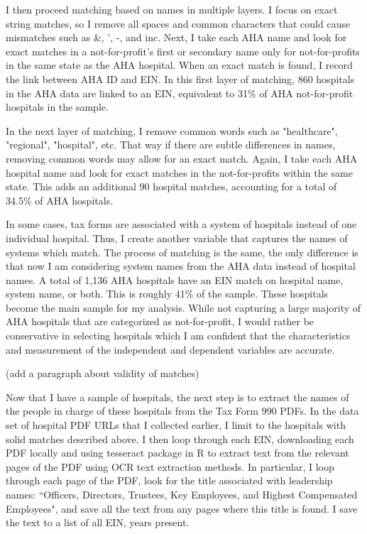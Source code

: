 \documentclass[12pt]{article}
\begin{document}
I then proceed matching based on names in multiple layers. I focus on exact string matches, so I remove all spaces and common characters that could cause mismatches such as \&, ', -, and inc. Next, I take each AHA name and look for exact matches in a not-for-profit's first or secondary name only for not-for-profits in the same state as the AHA hospital. When an exact match is found, I record the link between AHA ID and EIN. In this first layer of matching, 860 hospitals in the AHA data are linked to an EIN, equivalent to 31\% of AHA not-for-profit hospitals in the sample. 

In the next layer of matching, I remove common words such as "healthcare", "regional", "hospital", etc. That way if there are subtle differences in names, removing common words may allow for an exact match. Again, I take each AHA hospital name and look for exact matches in the not-for-profits within the same state. This adds an additional 90 hospital matches, accounting for a total of 34.5\% of AHA hospitals. 

In some cases, tax forms are associated with a system of hospitals instead of one individual hospital. Thus, I create another variable that captures the names of systems which match. The process of matching is the same, the only difference is that now I am considering system names from the AHA data instead of hospital names. A total of 1,136 AHA hospitals have an EIN match on hospital name, system name, or both. This is roughly 41\% of the sample. These hospitals become the main sample for my analysis. While not capturing a large majority of AHA hospitals that are categorized as not-for-profit, I would rather be conservative in selecting hospitals which I am confident that the characteristics and measurement of the independent and dependent variables are accurate. 

(add a paragraph about validity of matches)

 Now that I have a sample of hospitals, the next step is to extract the names of the people in charge of these hospitals from the Tax Form 990 PDFs. In the data set of hospital PDF URLs that I collected earlier, I limit to the hospitals with solid matches described above. I then loop through each EIN, downloading each PDF locally and using tesseract package in R to extract text from the relevant pages of the PDF using OCR text extraction methods. In particular, I loop through each page of the PDF, look for the title associated with leadership names: ``Officers, Directors, Trustees, Key Employees, and Highest Compensated Employees", and save all the text from any pages where this title is found. I save the text to a list of all EIN, years present. 
\end{document}

